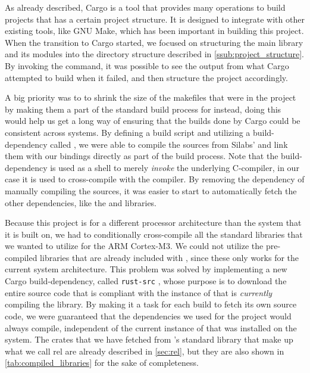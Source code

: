 As already described, Cargo is a tool that provides many operations to build {\rust} projects that has a certain project structure.
It is designed to integrate with other existing tools, like GNU Make, which has been important in  building this project.
When the transition to Cargo started, we focused on structuring the main library and its modules into the directory structure described in \autoref{ssub:project_structure}.
By invoking the  command, it was possible to see the output from what Cargo attempted to build when it failed, and then structure the project accordingly.

A big priority was to to shrink the size of the makefiles that were in the project by making them a part of the standard build process for {\emlib} instead, doing this would help us get a long way of ensuring that the builds done by Cargo could be consistent across systems.
By defining a {\rust} build script and utilizing a {\rust} build-dependency called  \cite{web:cargo_gcc}, we were able to compile the {\C} sources from Silabs' {\emlib} and link them with our bindings directly as part of the build process.
Note that the  build-dependency is used as a shell to merely \emph{invoke} the underlying C-compiler, in our case it is used to cross-compile with the {\armgcc} compiler.
By removing the dependency of manually compiling the {\C} sources, it was easier to start to automatically fetch the other dependencies, like the {\core} and  libraries.

Because this project is for a different processor architecture than the system that it is built on, we had to conditionally cross-compile all the standard {\rust} libraries that we wanted to utilize for the ARM Cortex-M3.
We could not utilize the pre-compiled libraries that are already included with {\rustc}, since these only works for the current system architecture.
This problem was solved by implementing a new Cargo build-dependency, called \texttt{rust-src} \cite{github:rust_src}, whose purpose is to download the entire {\rust} source code that is compliant with the instance of {\rustc} that is \emph{currently} compiling the library.
By making it a task for each build to fetch its own source code, we were guaranteed that the dependencies we used for the project would always compile, independent of the current instance of {\rustc} that was installed on the system.
The crates that we have fetched from {\rust}'s standard library that make up what we call \gls{rel} are already described in \autoref{sec:rel}, but they are also shown in \autoref{tab:compiled_libraries} for the sake of completeness.


